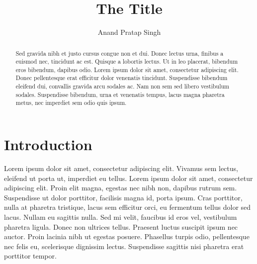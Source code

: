 \documentclass[preprint, review,12pt]{elsarticle}
\begin{document}
\begin{frontmatter}


\title{The Title}
\author{Anand Pratap Singh}%

\begin{abstract}
Sed gravida nibh et justo cursus congue non et dui. Donec lectus urna, finibus a euismod nec, tincidunt ac est. Quisque a lobortis lectus. Ut in leo placerat, bibendum eros bibendum, dapibus odio. Lorem ipsum dolor sit amet, consectetur adipiscing elit. Donec pellentesque erat efficitur dolor venenatis tincidunt. Suspendisse bibendum eleifend dui, convallis gravida arcu sodales ac. Nam non sem sed libero vestibulum sodales. Suspendisse bibendum, urna et venenatis tempus, lacus magna pharetra metus, nec imperdiet sem odio quis ipsum.
\end{abstract}

\begin{keyword}


\end{keyword}

\end{frontmatter}

\linenumbers

\section{Introduction}
\label{sec:introduction}
Lorem ipsum dolor sit amet, consectetur adipiscing elit. Vivamus sem lectus, eleifend ut porta ut, imperdiet eu tellus. Lorem ipsum dolor sit amet, consectetur adipiscing elit. Proin elit magna, egestas nec nibh non, dapibus rutrum sem. Suspendisse ut dolor porttitor, facilisis magna id, porta ipsum. Cras porttitor, nulla at pharetra tristique, lacus sem efficitur orci, eu fermentum tellus dolor sed lacus. Nullam eu sagittis nulla. Sed mi velit, faucibus id eros vel, vestibulum pharetra ligula. Donec non ultrices tellus. Praesent luctus suscipit ipsum nec auctor. Proin lacinia nibh ut egestas posuere. Phasellus turpis odio, pellentesque nec felis eu, scelerisque dignissim lectus. Suspendisse sagittis nisi pharetra erat porttitor tempor.
\end{document}
